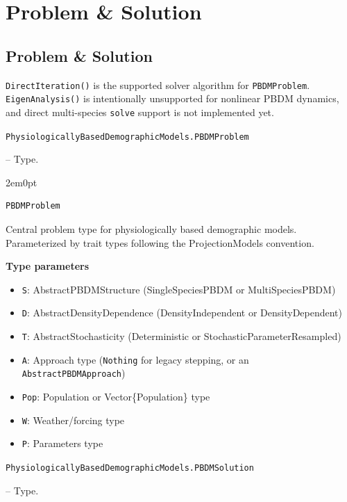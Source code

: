 \chapter{Problem \& Solution}


\section{Problem \& Solution}



\label{4831807479509523485}{}


\texttt{DirectIteration()} is the supported solver algorithm for \texttt{PBDMProblem}. \texttt{EigenAnalysis()} is intentionally unsupported for nonlinear PBDM dynamics, and direct multi-species \texttt{solve} support is not implemented yet.


\hypertarget{15830014513914431776}{\texttt{PhysiologicallyBasedDemographicModels.PBDMProblem}}  -- {Type.}

\begin{adjustwidth}{2em}{0pt}


\begin{verbatim}
PBDMProblem
\end{verbatim}

Central problem type for physiologically based demographic models. Parameterized by trait types following the ProjectionModels convention.

\textbf{Type parameters}

\begin{itemize}
\item \texttt{S}: AbstractPBDMStructure (SingleSpeciesPBDM or MultiSpeciesPBDM)


\item \texttt{D}: AbstractDensityDependence (DensityIndependent or DensityDependent)


\item \texttt{T}: AbstractStochasticity (Deterministic or StochasticParameterResampled)


\item \texttt{A}: Approach type (\texttt{Nothing} for legacy stepping, or an \texttt{AbstractPBDMApproach})


\item \texttt{Pop}: Population or Vector\{Population\} type


\item \texttt{W}: Weather/forcing type


\item \texttt{P}: Parameters type

\end{itemize}


\end{adjustwidth}
\hypertarget{8669862128027430749}{\texttt{PhysiologicallyBasedDemographicModels.PBDMSolution}}  -- {Type.}

